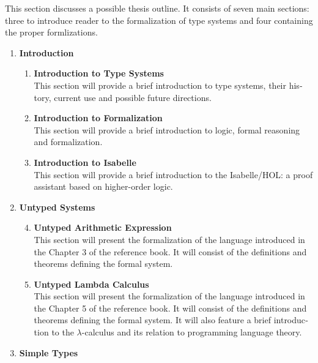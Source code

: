 \documentclass[a4paper, oneside, 12pt, titlepage]{article}
\begin{document}
\begin{otherlanguage}{english}
  This section discusses a possible thesis outline. It consists of seven main sections: three to
  introduce reader to the formalization of type systems and four containing the proper formlizations.

  \begin{enumerate}[label=\textbf{\Roman*}]
    \item \textbf{Introduction}
      \begin{enumerate}[label=\textbf{\arabic*}]
        \item \textbf{Introduction to Type Systems} ~ \\
          This section will provide a brief introduction to type systems, their history, current use
          and possible future directions.
        \item \textbf{Introduction to Formalization} ~ \\
          This section will provide a brief introduction to logic, formal reasoning and formalization.
        \item \textbf{Introduction to Isabelle} ~ \\
          This section will provide a brief introduction to the Isabelle/HOL: a proof
          assistant based on higher-order logic.
      \end{enumerate}
    \item \textbf{Untyped Systems}
      \begin{enumerate}[label=\textbf{\arabic*}]
        \setcounter{enumii}{3}
        \item \textbf{Untyped Arithmetic Expression} ~ \\
          This section will present the formalization of the language introduced in the Chapter 3 of
          the reference book. It will consist of the definitions and theorems defining the formal
          system.
        \item \textbf{Untyped Lambda Calculus} ~ \\
          This section will present the formalization of the language introduced in the Chapter 5 of
          the reference book. It will consist of the definitions and theorems defining the formal
          system. It will also feature a brief introduction to the $\lambda$-calculus and its relation
          to programming language theory.
      \end{enumerate}
    \item \textbf{Simple Types}
      \begin{enumerate}[label=\textbf{\arabic*}]

\end{enumerate}
\end{enumerate}
\end{otherlanguage}
\end{document}
